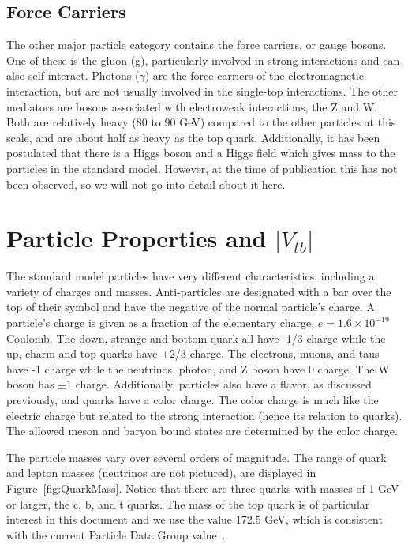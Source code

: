 \subsection{Force Carriers}
The other major particle category contains the force carriers, or gauge bosons. One of these is the gluon (g), particularly involved in strong interactions and can also self-interact.  Photons ($\gamma$) are the force carriers of the electromagnetic interaction, but are not usually involved in the single-top interactions.  The other mediators are bosons associated with electroweak interactions, the Z and W.  Both are relatively heavy (80 to 90 GeV) compared to the other particles at this scale, and are about half as heavy as the top quark.  Additionally, it has been postulated that there is a Higgs boson and a Higgs field which gives mass to the particles in the standard model.  However, at the time of publication this has not been observed, so we will not go into detail about it here.

\section{Particle Properties and $|V_{tb}|$}\label{sec:vtb}
The standard model particles have very different characteristics, including a variety of charges and masses.  Anti-particles are designated with a bar over the top of their symbol and have the negative of the normal particle's charge.  A particle's charge is given as a fraction of the elementary charge, $e=1.6\times 10^{-19}$ Coulomb.  The down, strange and bottom quark all have -1/3 charge while the up, charm and top quarks have +2/3 charge.  The electrons, muons, and taus have -1 charge while the neutrinos, photon, and Z boson have 0 charge.  The W boson has $\pm1$ charge.  Additionally, particles also have a flavor, as discussed previously, and quarks have a color charge.  The color charge is much like the electric charge but related to the strong interaction (hence its relation to quarks).  The allowed meson and baryon bound states are determined by the color charge.

The particle masses vary over several orders of magnitude.  The range of quark and lepton masses (neutrinos are not pictured), are displayed in Figure~\ref{fig:QuarkMass}.  Notice that there are three quarks with masses of 1 GeV or larger, the c, b, and t quarks.  The mass of the top quark is of particular interest in this document and we use the value 172.5 GeV, which is consistent with the current Particle Data Group value~\cite{PDGSummary}.

